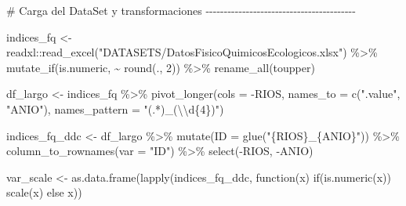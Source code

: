 \documentclass[
  10pt,
  letterpaper,
  DIV=11,
  numbers=noendperiod]{scrreprt}
\newenvironment{Shaded}{\begin{snugshade}}{\end{snugshade}}
\newcommand{\AttributeTok}[1]{\textcolor[rgb]{0.40,0.45,0.13}{#1}}
\newcommand{\CommentTok}[1]{\textcolor[rgb]{0.37,0.37,0.37}{#1}}
\newcommand{\ControlFlowTok}[1]{\textcolor[rgb]{0.00,0.23,0.31}{#1}}
\newcommand{\DecValTok}[1]{\textcolor[rgb]{0.68,0.00,0.00}{#1}}
\newcommand{\FunctionTok}[1]{\textcolor[rgb]{0.28,0.35,0.67}{#1}}
\newcommand{\NormalTok}[1]{\textcolor[rgb]{0.00,0.23,0.31}{#1}}
\newcommand{\OtherTok}[1]{\textcolor[rgb]{0.00,0.23,0.31}{#1}}
\newcommand{\SpecialCharTok}[1]{\textcolor[rgb]{0.37,0.37,0.37}{#1}}
\newcommand{\StringTok}[1]{\textcolor[rgb]{0.13,0.47,0.30}{#1}}
\begin{document}
\begin{Shaded}
\begin{Highlighting}[numbers=left,,]
\CommentTok{\# Carga del DataSet y transformaciones {-}{-}{-}{-}{-}{-}{-}{-}{-}{-}{-}{-}{-}{-}{-}{-}{-}{-}{-}{-}{-}{-}{-}{-}{-}{-}{-}{-}{-}{-}{-}{-}{-}{-}{-}{-}{-}{-}{-}{-}{-}}

\NormalTok{indices\_fq }\OtherTok{\textless{}{-}}\NormalTok{ readxl}\SpecialCharTok{::}\FunctionTok{read\_excel}\NormalTok{(}\StringTok{"DATASETS/DatosFisicoQuimicosEcologicos.xlsx"}\NormalTok{) }\SpecialCharTok{\%\textgreater{}\%} 
  \FunctionTok{mutate\_if}\NormalTok{(is.numeric, }\SpecialCharTok{\textasciitilde{}} \FunctionTok{round}\NormalTok{(., }\DecValTok{2}\NormalTok{)) }\SpecialCharTok{\%\textgreater{}\%}
  \FunctionTok{rename\_all}\NormalTok{(toupper)}

\NormalTok{df\_largo }\OtherTok{\textless{}{-}}\NormalTok{ indices\_fq }\SpecialCharTok{\%\textgreater{}\%}
    \FunctionTok{pivot\_longer}\NormalTok{(}\AttributeTok{cols =} \SpecialCharTok{{-}}\NormalTok{RIOS, }
                 \AttributeTok{names\_to =} \FunctionTok{c}\NormalTok{(}\StringTok{".value"}\NormalTok{, }\StringTok{"ANIO"}\NormalTok{), }
                 \AttributeTok{names\_pattern =} \StringTok{"(.*)\_(}\SpecialCharTok{\textbackslash{}\textbackslash{}}\StringTok{d\{4\})"}\NormalTok{)}

\NormalTok{indices\_fq\_ddc }\OtherTok{\textless{}{-}}\NormalTok{ df\_largo }\SpecialCharTok{\%\textgreater{}\%}
    \FunctionTok{mutate}\NormalTok{(}\AttributeTok{ID =} \FunctionTok{glue}\NormalTok{(}\StringTok{"\{RIOS\}\_\{ANIO\}"}\NormalTok{)) }\SpecialCharTok{\%\textgreater{}\%}
    \FunctionTok{column\_to\_rownames}\NormalTok{(}\AttributeTok{var =} \StringTok{"ID"}\NormalTok{) }\SpecialCharTok{\%\textgreater{}\%} 
    \FunctionTok{select}\NormalTok{(}\SpecialCharTok{{-}}\NormalTok{RIOS,}
           \SpecialCharTok{{-}}\NormalTok{ANIO)}

\NormalTok{var\_scale }\OtherTok{\textless{}{-}} \FunctionTok{as.data.frame}\NormalTok{(}\FunctionTok{lapply}\NormalTok{(indices\_fq\_ddc, }\ControlFlowTok{function}\NormalTok{(x) }\ControlFlowTok{if}\NormalTok{(}\FunctionTok{is.numeric}\NormalTok{(x)) }\FunctionTok{scale}\NormalTok{(x) }\ControlFlowTok{else}\NormalTok{ x))}


\end{Highlighting}
\end{Shaded}
\end{document}
